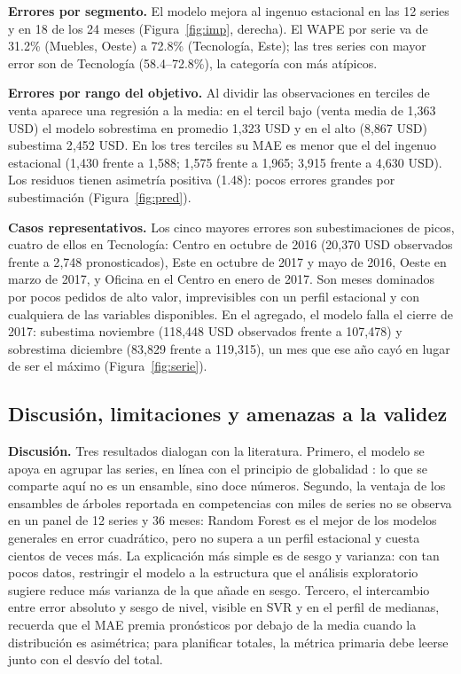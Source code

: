 \documentclass[pdflatex,sn-mathphys-num]{sn-jnl}
\begin{document}
\textbf{Errores por segmento.} El modelo mejora al ingenuo estacional en las 12 series y en 18 de los 24 meses (Figura~\ref{fig:imp}, derecha). El WAPE por serie va de 31.2\% (Muebles, Oeste) a 72.8\% (Tecnología, Este); las tres series con mayor error son de Tecnología (58.4--72.8\%), la categoría con más atípicos.

\textbf{Errores por rango del objetivo.} Al dividir las observaciones en terciles de venta aparece una regresión a la media: en el tercil bajo (venta media de 1{,}363 USD) el modelo sobrestima en promedio 1{,}323 USD y en el alto (8{,}867 USD) subestima 2{,}452 USD. En los tres terciles su MAE es menor que el del ingenuo estacional (1{,}430 frente a 1{,}588; 1{,}575 frente a 1{,}965; 3{,}915 frente a 4{,}630 USD). Los residuos tienen asimetría positiva (1.48): pocos errores grandes por subestimación (Figura~\ref{fig:pred}).

\textbf{Casos representativos.} Los cinco mayores errores son subestimaciones de picos, cuatro de ellos en Tecnología: Centro en octubre de 2016 (20{,}370 USD observados frente a 2{,}748 pronosticados), Este en octubre de 2017 y mayo de 2016, Oeste en marzo de 2017, y Oficina en el Centro en enero de 2017. Son meses dominados por pocos pedidos de alto valor, imprevisibles con un perfil estacional y con cualquiera de las variables disponibles. En el agregado, el modelo falla el cierre de 2017: subestima noviembre (118{,}448 USD observados frente a 107{,}478) y sobrestima diciembre (83{,}829 frente a 119{,}315), un mes que ese año cayó en lugar de ser el máximo (Figura~\ref{fig:serie}).

\subsection{Discusión, limitaciones y amenazas a la validez}\label{subsec:discusion}

\textbf{Discusión.} Tres resultados dialogan con la literatura. Primero, el modelo se apoya en agrupar las series, en línea con el principio de globalidad \cite{monteromanso2021}: lo que se comparte aquí no es un ensamble, sino doce números. Segundo, la ventaja de los ensambles de árboles reportada en competencias con miles de series \cite{makridakis2022} no se observa en un panel de 12 series y 36 meses: Random Forest es el mejor de los modelos generales en error cuadrático, pero no supera a un perfil estacional y cuesta cientos de veces más. La explicación más simple es de sesgo y varianza: con tan pocos datos, restringir el modelo a la estructura que el análisis exploratorio sugiere reduce más varianza de la que añade en sesgo. Tercero, el intercambio entre error absoluto y sesgo de nivel, visible en SVR y en el perfil de medianas, recuerda que el MAE premia pronósticos por debajo de la media cuando la distribución es asimétrica; para planificar totales, la métrica primaria debe leerse junto con el desvío del total.
\end{document}

